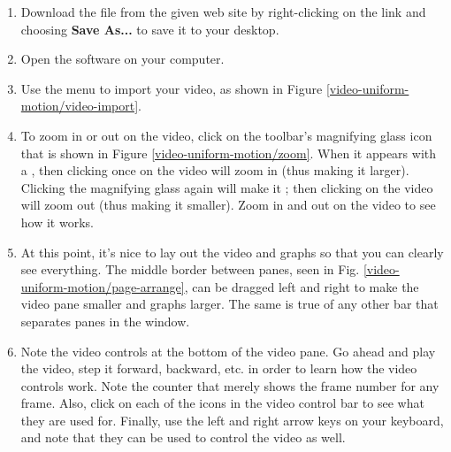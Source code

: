 


\procedure

\begin{enumerate}
	\item Download the file  from the given web site by right-clicking on the link and choosing {\bf Save As...} to save it to your desktop.
	\item Open the  software on your computer.
	\item Use the menu  to import your video, as shown in Figure \ref{video-uniform-motion/video-import}.

	
	\item To zoom in or out on the video, click on the toolbar's magnifying glass icon that is shown in Figure \ref{video-uniform-motion/zoom}. When it appears with a \button{+}, then clicking once on the video will zoom in (thus making it larger).  Clicking the magnifying glass again will make it \button{--}; then clicking on the video will zoom out (thus making it smaller). Zoom in and out on the video to see how it works.
	
	
	\item At this point, it's nice to lay out the video and graphs so that you can clearly see everything. The middle border between panes, seen in Fig. \ref{video-uniform-motion/page-arrange}, can be dragged left and right to make the video pane smaller and graphs larger. The same is true of any other bar that separates panes in the window.
	
		
	\item Note the video controls at the bottom of the video pane. Go ahead and play the video, step it forward, backward, etc. in order to learn how the video controls work. Note the counter that merely shows the frame number for any frame. Also, click on each of the icons in the video control bar to see what they are used for. Finally, use the left and right arrow keys on your keyboard, and note that they can be used to control the video as well.


\end{enumerate}
